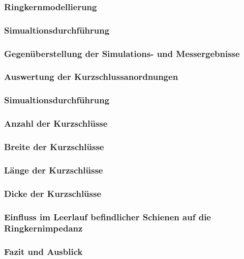 \documentclass[accentcolor=tud9b, colorbacktitle, inverttitle]{tudbeamer}
\begin{document}
\begin{frame}\frametitle{Ringkernmodellierung}

\end{frame}



\begin{frame}\frametitle{Simualtionsdurchf\"uhrung}

\end{frame}



\begin{frame}\frametitle{Gegen\"uberstellung der Simulations- und Messergebnisse}

\end{frame}



\begin{frame}\frametitle{Auswertung der Kurzschlussanordnungen}

\end{frame}



\begin{frame}\frametitle{Simualtionsdurchf\"uhrung}

\end{frame}





\begin{frame}\frametitle{Anzahl der Kurzschl\"usse}

\end{frame}



\begin{frame}\frametitle{Breite der Kurzschlüsse}

\end{frame}


\begin{frame}\frametitle{Länge der Kurzschlüsse}

\end{frame}


\begin{frame}\frametitle{Dicke der Kurzschlüsse}

\end{frame}




\begin{frame}\frametitle{Einfluss im Leerlauf befindlicher Schienen auf die Ringkernimpedanz}

\end{frame}



\begin{frame}\frametitle{Fazit und Ausblick}

\end{frame}

% 	 
\end{document}
